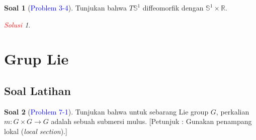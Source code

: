 \documentclass[11pt]{article}
\theoremstyle{definition}
\newtheorem*{problem}{Soal}
\theoremstyle{remark}
\newtheorem*{solution}{\textcolor{red}{Solusi}}
\begin{document}
\begin{problem}[\textcolor{blue}{Problem 3-4}]
Tunjukan bahwa $T\mathbb{S}^1$ diffeomorfik dengan $\mathbb{S}^1 \times \mathbb{R}$.
\end{problem}

\begin{solution}

\end{solution}






\section{Grup Lie}

\subsection{Soal Latihan}
\begin{problem}[\textcolor{blue}{Problem 7-1}]
Tunjukan bahwa untuk sebarang Lie group $G$, perkalian $m : G \times G \to G$ adalah sebuah submersi mulus. [Petunjuk : Gunakan penampang lokal (\textit{local section}).]
\end{problem}
\end{document}
